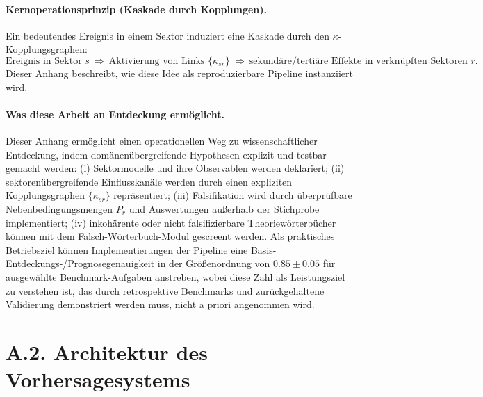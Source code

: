 \documentclass[13pt,a4paper]{article}
\begin{document}
	\paragraph{Kernoperationsprinzip (Kaskade durch Kopplungen).}
	Ein bedeutendes Ereignis in einem Sektor induziert eine Kaskade durch den $\kappa$-Kopplungsgraphen:
	\[ \text{Ereignis in Sektor } s \ \Rightarrow\ \text{Aktivierung von Links }\{\kappa_{sr}\}\ \Rightarrow\ \text{sekundäre/tertiäre Effekte in verknüpften Sektoren } r. \]
	Dieser Anhang beschreibt, wie diese Idee als reproduzierbare Pipeline instanziiert wird.
	
	\paragraph{Was diese Arbeit an Entdeckung ermöglicht.}
	Dieser Anhang ermöglicht einen operationellen Weg zu wissenschaftlicher Entdeckung, indem domänenübergreifende Hypothesen explizit und testbar gemacht werden: (i) Sektormodelle und ihre Observablen werden deklariert; (ii) sektorenübergreifende Einflusskanäle werden durch einen expliziten Kopplungsgraphen $\{\kappa_{sr}\}$ repräsentiert; (iii) Falsifikation wird durch überprüfbare Nebenbedingungsmengen $P_r$ und Auswertungen außerhalb der Stichprobe implementiert; (iv) inkohärente oder nicht falsifizierbare Theoriewörterbücher können mit dem Falsch-Wörterbuch-Modul gescreent werden.
	Als praktisches Betriebsziel können Implementierungen der Pipeline eine Basis-Entdeckungs-/Prognosegenauigkeit in der Größenordnung von $0.85\pm0.05$ für ausgewählte Benchmark-Aufgaben anstreben, wobei diese Zahl als Leistungsziel zu verstehen ist, das durch retrospektive Benchmarks und zurückgehaltene Validierung demonstriert werden muss, nicht a priori angenommen wird.
	
	\section*{A.2. Architektur des Vorhersagesystems}
	
\end{document}
